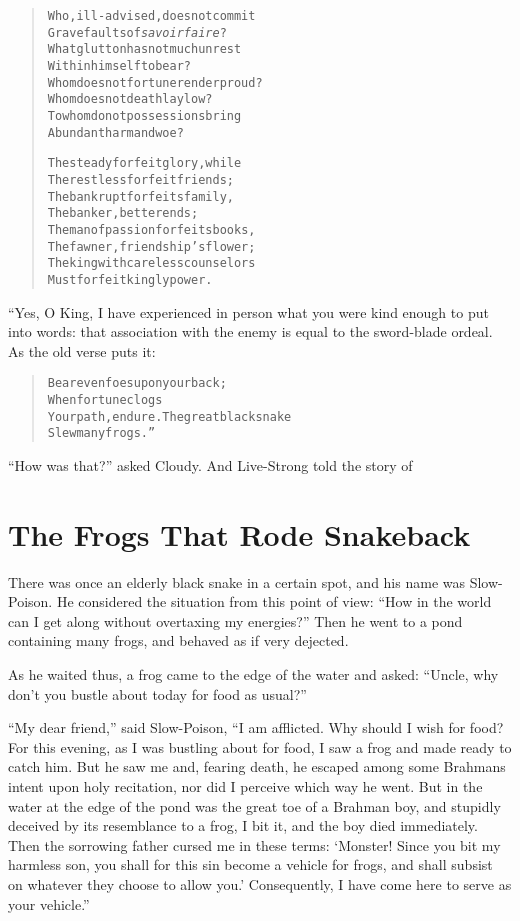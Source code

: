 \documentclass[article, twoside, 14pt]{memoir}
\renewenvironment{verbatim}{%
\begin{quote}%
\vskip -10pt%
\begin{alltt}\normalfont\large}{\end{alltt}%
\end{quote}%
\vskip -10pt
} %
\begin{document}
\begin{verbatim}
Who, ill-advised, does not commit
    Grave faults of \emph{savoir faire}?
What glutton has not much unrest
    Within himself to bear?
Whom does not fortune render proud?
    Whom does not death lay low?
To whom do not possessions bring
    Abundant harm and woe?

The steady forfeit glory, while
    The restless forfeit friends;
The bankrupt forfeits family,
    The banker, better ends;
The man of passion forfeits books,
    The fawner, friendship's flower;
The king with careless counselors
    Must forfeit kingly power.
\end{verbatim}
“Yes, O King, I have experienced in person what you were kind
enough to put into words: that association with the enemy is equal
to the sword-blade ordeal. As the old verse puts it:

\begin{verbatim}
Bear even foes upon your back;
    When fortune clogs
Your path, endure. The great black snake
    Slew many frogs.”
\end{verbatim}
``How was that?'' asked Cloudy. And Live-Strong told the story of

\chapter{The Frogs That Rode Snakeback}

\label{s63}

There was once an elderly black snake in a certain spot, and his
name was Slow-Poison. He considered the situation from this point
of view:
``How in the world can I get along without overtaxing my energies?''
Then he went to a pond containing many frogs, and behaved as if
very dejected.

As he waited thus, a frog came to the edge of the water and asked:
``Uncle, why don't you bustle about today for food as usual?''

``My dear friend,'' said Slow-Poison,
``I am afflicted. Why should I wish for food? For this evening, as I was bustling about for food, I saw a frog and made ready to catch him. But he saw me and, fearing death, he escaped among some Brahmans intent upon holy recitation, nor did I perceive which way he went. But in the water at the edge of the pond was the great toe of a Brahman boy, and stupidly deceived by its resemblance to a frog, I bit it, and the boy died immediately. Then the sorrowing father cursed me in these terms: `Monster! Since you bit my harmless son, you shall for this sin become a vehicle for frogs, and shall subsist on whatever they choose to allow you.' Consequently, I have come here to serve as your vehicle.''
\end{document}
